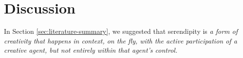 \section{Discussion} \label{sec:discussion}






In Section \ref{sec:literature-summary}, we suggested that serendipity
is \emph{a form of creativity that happens in context, on the fly,
  with the active participation of a creative agent, but not entirely
  within that agent's control.}  %

